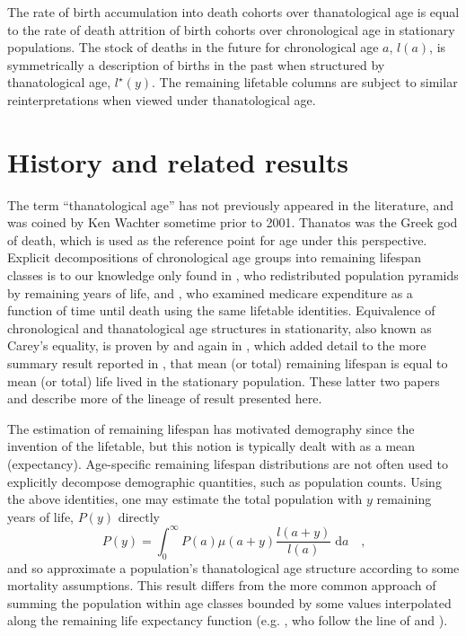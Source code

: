 \documentclass{article}
\newcommand{\dd}{\; \mathrm{d}}
\begin{document}
The rate of birth accumulation into death cohorts over thanatological age is
equal to the rate of death attrition of birth cohorts over chronological age in
stationary populations. The stock of deaths in the future for
chronological age $a$, $l(a)$, is symmetrically a description of births in the
past when structured by thanatological age, $l^\star(y)$. The remaining
lifetable columns are subject to similar reinterpretations when viewed under
thanatological age.

\section*{History and related results}

The term ``thanatological age'' has not previously appeared in the
literature, and was coined by Ken Wachter sometime prior to 2001. Thanatos was
the Greek god of death, which is used as the reference point for age under this
perspective. Explicit decompositions of chronological
age groups into remaining lifespan classes is to our knowledge only found in
\citet{brouard1986structure}, who redistributed
population pyramids by remaining years of life, and
\citet{miller2001increasing}, who examined medicare expenditure as a function of time until death using the
same lifetable identities. Equivalence of chronological and
thanatological age structures in stationarity, also known as Carey's equality,
is proven by \citet{brouard1989mouvements} and again in
 \citet{vaupel2009life}, which added detail to the more summary result reported
 in \citet{goldstein2009life}, that mean (or total) remaining lifespan is equal to mean (or total) life lived in the stationary population.
These latter two papers and \citet{goldstein2012historical} describe more of the
lineage of result presented here. 

The estimation of remaining lifespan has motivated demography since
the invention of the lifetable, but this notion is typically dealt with as a
mean (expectancy). Age-specific remaining lifespan distributions are not often
used to explicitly decompose demographic quantities, such as population counts. Using
the above identities, one may estimate the total population with $y$
remaining years of life, $P(y)$ directly
\begin{equation}
\label{eq:getpy}
P(y) = \int _0 ^\infty P(a)\mu(a+y)\frac{l(a+y)}{l(a)} \dd a \quad \text{,}
\end{equation}
\noindent and so approximate a population's thanatological age structure
according to some mortality assumptions. This result differs from the more common approach
of summing the population within age classes bounded by some values interpolated
along the remaining life expectancy function (e.g.
\citet{sanderson2005average,sanderson2007new,sanderson2010remeasuring}, who
follow the line of \citet{hersch1944demographie} and \citet{ryder1975notes}).
\end{document}
